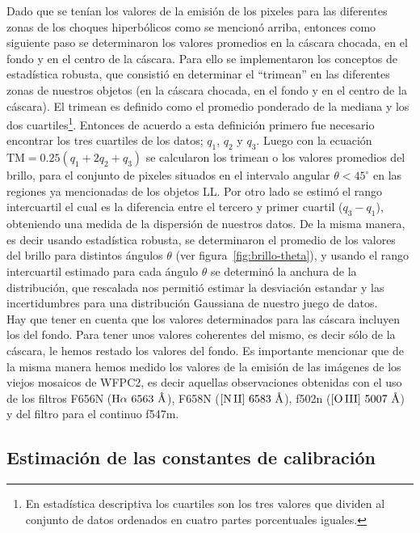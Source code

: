 Dado que se tenían los valores de la emisión de los pixeles para las diferentes zonas de los choques hiperbólicos como se mencionó arriba, entonces como siguiente paso se determinaron los valores promedios en la cáscara chocada, en el fondo y en el centro de la cáscara. Para ello se implementaron los conceptos de  estadística robusta, que consistió en determinar el ``trimean'' en las diferentes zonas de nuestros objetos (en la cáscara chocada, en el fondo y en el centro de la cáscara). El trimean es definido como el promedio ponderado de la mediana y los dos cuartiles\footnote{En estadística descriptiva los cuartiles son los tres valores que dividen al conjunto de datos ordenados en cuatro partes porcentuales iguales.}. Entonces de acuerdo a esta definición primero fue necesario encontrar los tres cuartiles de los datos; \(q_{1}\), \(q_{2}\) y \(q_{3}\). Luego con la  ecuación \(\text{TM} = 0.25(q_{1} + 2q_{2} + q_{3})\) se calcularon los trimean o los valores promedios del brillo, para el conjunto de pixeles situados en el intervalo angular \(\theta < 45^{\circ}\) en las regiones ya mencionadas de los objetos LL. Por otro lado se estimó el rango intercuartil el cual es la diferencia entre el tercero y primer cuartil (\(q_{3} - q_{1}\)), obteniendo una medida de la dispersión de nuestros datos. De la misma manera, es decir usando estadística robusta, se determinaron el promedio de los valores del brillo para distintos ángulos \(\theta\) (ver figura~\ref{fig:brillo-theta}), y usando el rango intercuartil estimado para cada ángulo \(\theta\) se determinó la anchura de la distribución, que rescalada nos permitió  estimar la desviación estandar y las incertidumbres para una distribución Gaussiana de nuestro juego de datos. \\
 
Hay que tener en cuenta que los valores determinados para las cáscara incluyen los del fondo. Para tener unos valores coherentes del mismo, es decir sólo de la cáscara, le hemos restado los valores del fondo. Es importante mencionar que de la misma manera hemos medido los valores de la emisión de las  imágenes de los viejos  mosaicos de WFPC2, es decir aquellas  observaciones obtenidas con el uso de los filtros F656N (\(\mathrm{\mathrm{H}\alpha~6563~\text{\AA{}}{}}\)), F658N (\(\mathrm{\mathrm{[N\,II]}~6583~\text{\AA{}}{}}\)), f502n (\(\mathrm{[O\,III]}{}~5007~\text{\AA{}}{}\)) y del filtro para el continuo f547m.\\

\subsection{Estimación de las constantes de calibración}

